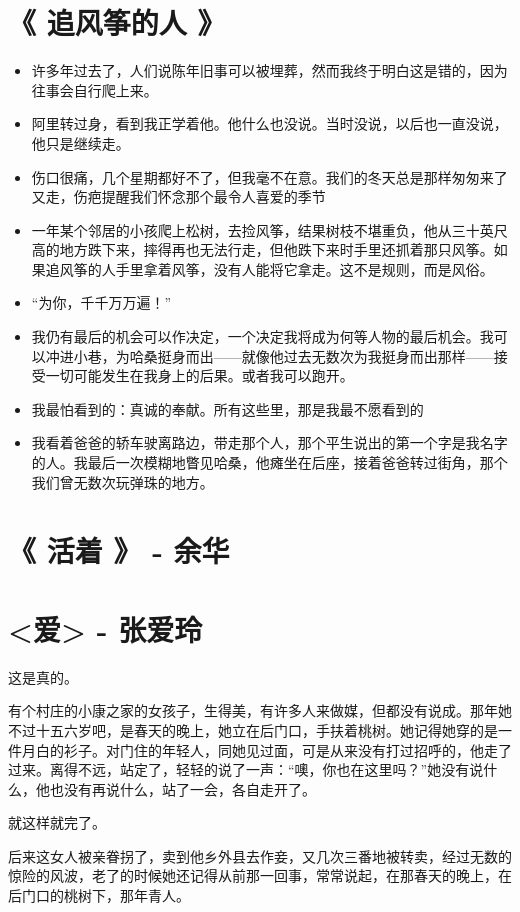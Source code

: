 \documentclass[UTF8,a4paper,8pt]{ctexart}
\begin{document}
 \section{《 追风筝的人 》 } 
 \begin{itemize}
 	\item 许多年过去了，人们说陈年旧事可以被埋葬，然而我终于明白这是错的，因为往事会自行爬上来。
 	\item 阿里转过身，看到我正学着他。他什么也没说。当时没说，以后也一直没说，他只是继续走。
 	\item 伤口很痛，几个星期都好不了，但我毫不在意。我们的冬天总是那样匆匆来了又走，伤疤提醒我们怀念那个最令人喜爱的季节
 	\item 一年某个邻居的小孩爬上松树，去捡风筝，结果树枝不堪重负，他从三十英尺高的地方跌下来，摔得再也无法行走，但他跌下来时手里还抓着那只风筝。如果追风筝的人手里拿着风筝，没有人能将它拿走。这不是规则，而是风俗。
 	\item “为你，千千万万遍！”
 	\item 我仍有最后的机会可以作决定，一个决定我将成为何等人物的最后机会。我可以冲进小巷，为哈桑挺身而出——就像他过去无数次为我挺身而出那样——接受一切可能发生在我身上的后果。或者我可以跑开。
 	\item 我最怕看到的：真诚的奉献。所有这些里，那是我最不愿看到的
 	\item 我看着爸爸的轿车驶离路边，带走那个人，那个平生说出的第一个字是我名字的人。我最后一次模糊地瞥见哈桑，他瘫坐在后座，接着爸爸转过街角，那个我们曾无数次玩弹珠的地方。
 \end{itemize}
 \newpage			
 \section{《 活着 》 -  余华 } 
 
 \newpage
 \section{<爱> - 张爱玲}
 这是真的。
 
 有个村庄的小康之家的女孩子，生得美，有许多人来做媒，但都没有说成。那年她不过十五六岁吧，是春天的晚上，她立在后门口，手扶着桃树。她记得她穿的是一件月白的衫子。对门住的年轻人，同她见过面，可是从来没有打过招呼的，他走了过来。离得不远，站定了，轻轻的说了一声：“噢，你也在这里吗？”她没有说什么，他也没有再说什么，站了一会，各自走开了。
 
 就这样就完了。
 
 后来这女人被亲眷拐了，卖到他乡外县去作妾，又几次三番地被转卖，经过无数的惊险的风波，老了的时候她还记得从前那一回事，常常说起，在那春天的晚上，在后门口的桃树下，那年青人。
 
\end{document}
